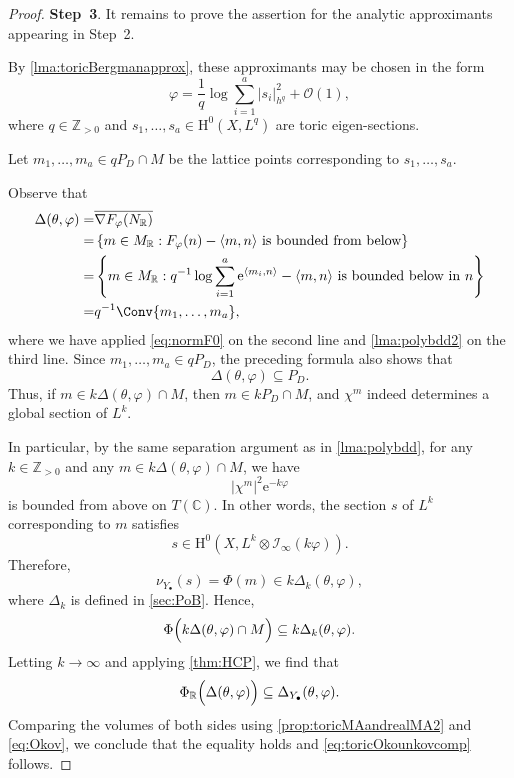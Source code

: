 \begin{proof}
    \textbf{Step~3}. It remains to prove the assertion for the analytic approximants appearing in Step~2.

    By \cref{lma:toricBergmanapprox}, these approximants may be chosen in the form
    \[
        \varphi=\frac{1}{q}\log\sum_{i=1}^a |s_i|_{h^q}^2+\mathcal O(1),
    \]
    where $q\in\mathbb Z_{>0}$ and $s_1,\ldots,s_a\in \mathrm{H}^0(X,L^q)$ are toric eigen-sections.

    Let $m_1,\ldots,m_a\in qP_D\cap M$ be the lattice points corresponding to $s_1,\ldots,s_a$.

    Observe that
    \[
    \begin{aligned}
    \Delta(\theta,\varphi)
    =&\overline{\nabla F_{\varphi}(N_{\mathbb{R}})}\\
    =&\left\{ m\in M_{\mathbb{R}} : F_{\varphi}(n)-\langle m,n \rangle \textup{ is bounded from below} \right\}\\
    =& \left\{ m\in M_{\mathbb{R}}:  q^{-1}\log \sum_{i=1}^a \mathrm{e}^{\langle m_i,n\rangle}-\langle m,n\rangle \textup{ is bounded below in } n \right\}\\
    =& q^{-1}\Conv \{m_1,\ldots,m_a\},
    \end{aligned}
    \]
    where we have applied \eqref{eq:normF0} on the second line and \cref{lma:polybdd2} on the third line.
    Since $m_1,\ldots,m_a\in qP_D$, the preceding formula also shows that
    \[
        \Delta(\theta,\varphi)\subseteq P_D.
    \]
    Thus, if $m\in k\Delta(\theta,\varphi)\cap M$, then $m\in kP_D\cap M$, and $\chi^m$ indeed determines a global section of $L^k$.


    In particular, by the same separation argument as in \cref{lma:polybdd}, for any $k\in \mathbb{Z}_{>0}$ and any $m\in k\Delta(\theta,\varphi)\cap M$, we have
    \[
    |\chi^m|^2 \mathrm{e}^{-k\varphi}
    \]
    is bounded from above on $T(\mathbb{C})$. In other words, the section $s$ of $L^k$ corresponding to $m$ satisfies
    \[
    s\in \mathrm{H}^0\left(X,L^k\otimes \mathcal{I}_{\infty}(k\varphi)\right).
    \]
    Therefore,
    \[
    \nu_{Y_{\bullet}}(s)=\Phi(m)\in k\Delta_k(\theta,\varphi),
    \]
    where $\Delta_k$ is defined in \cref{sec:PoB}.
    Hence,
    \[
    \Phi\Bigl(k\Delta(\theta,\varphi)\cap M\Bigr)\subseteq k\Delta_k(\theta,\varphi).
    \]
    Letting $k\to \infty$ and applying \cref{thm:HCP}, we find that
    \[
    \Phi_{\mathbb{R}}\Bigl(\Delta(\theta,\varphi)\Bigr) \subseteq \Delta_{Y_{\bullet}}(\theta,\varphi).
    \]
    Comparing the volumes of both sides using \cref{prop:toricMAandrealMA2} and \eqref{eq:Okov}, we conclude that the equality holds and \eqref{eq:toricOkounkovcomp} follows.
\end{proof}


